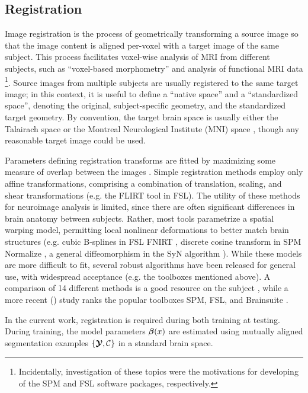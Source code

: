 \subsection{Registration}\label{ss:meth-reg}
Image registration is the process of geometrically transforming a source image so that the image content is aligned per-voxel with a target image of the same subject.
This process facilitates voxel-wise analysis of MRI from different subjects, such as  ``voxel-based morphometry'' \cite{Ashburner2000a} and analysis of functional MRI data \cite{Smith2004}%
\footnote{Incidentally, investigation of these topics were the motivations for developing of the SPM and FSL software packages, respectively.}.
Source images from multiple subjects are usually registered to the same target image; 
in this context, it is useful to define a ``native space'' and a ``standardized space'', denoting the original, subject-specific geometry, and the standardized target geometry.
By convention, the target brain space is usually either the Talairach space \cite{Talairach1988} or the Montreal Neurological Institute (MNI) space \cite{Evans1993}, though any reasonable target image could be used.
\par
Parameters defining registration transforms are fitted by maximizing some measure of overlap between the images \cite{Sotiras2013}.
Simple registration methods employ only affine transformations, comprising a combination of translation, scaling, and shear transformations (e.g. the FLIRT tool \cite{Jenkinson2002} in FSL).
The utility of these methods for neuroimage analysis is limited, since there are often significant differences in brain anatomy between subjects.
Rather, most tools parametrize a spatial warping model, permitting local nonlinear deformations to better match brain structures (e.g.
cubic B-splines in FSL FNIRT \cite{Andersson2007},
discrete cosine transform in SPM Normalize \cite{Ashburner1997,Ashburner2005},
a general diffeomorphism in the SyN algorithm \cite{Avants2008}).
While these models are more difficult to fit, several robust algorithms have been released for general use, with widespread acceptance (e.g. the toolboxes mentioned above).
A \citeyear{Klein2009} comparison of 14 different methods is a good resource on the subject \cite{Klein2009}, while a more recent (\citeyear{Kazemi2014}) study ranks the popular toolboxes SPM, FSL, and Brainsuite \cite{Kazemi2014}.
\par
In the current work, registration is required during both training at testing.
During training, the model parameters $\bm{\beta}(x)$ are estimated using mutually aligned segmentation examples $\{\bm{\mathcal{Y}},\mathcal{C}\}$ in a standard brain space.

